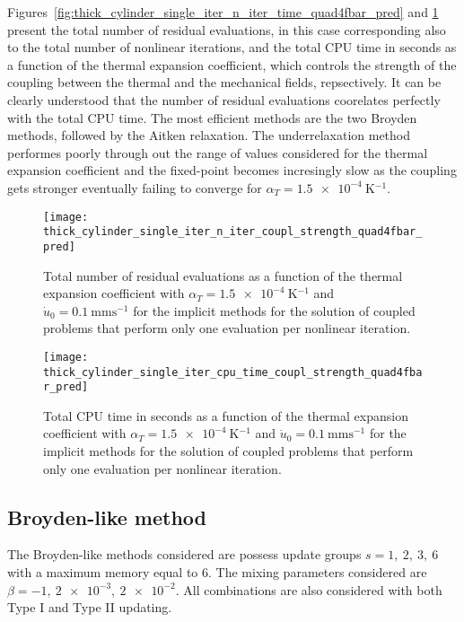 Figures~\ref{fig:thick_cylinder_single_iter_n_iter_time_quad4fbar_pred} and \ref{fig:thick_cylinder_single_iter_n_iter_coupl_strength_quad4fbar_pred} present the total number of residual evaluations, in this case corresponding also to the total number of nonlinear iterations, and the total CPU time in seconds as a function of the thermal expansion coefficient, which controls the strength of the coupling between the thermal and the mechanical fields, repsectively.
It can be clearly understood that the number of residual evaluations coorelates perfectly with the total CPU time.
The most efficient methods are the two Broyden methods, followed by the Aitken relaxation.
The underrelaxation method performes poorly through out the range of values considered for the thermal expansion coefficient and the fixed-point becomes incresingly slow as the coupling gets stronger eventually failing to converge for \(\alpha_T=\SI{1.5e-4}{\kelvin^{-1}}\).

\begin{figure}[htbp]
  \texttt{[image: thick\_cylinder\_single\_iter\_n\_iter\_coupl\_strength\_quad4fbar\_pred]}
  \caption{Total number of residual evaluations as a function of the thermal expansion coefficient with \(\alpha_T=\SI{1.5e-4}{\kelvin^{-1}}\) and \(\dot u_0 =\SI{0.1}{\milli\meter\second^{-1}}\) for the implicit methods for the solution of coupled problems that perform only one evaluation per nonlinear iteration.}
\label{fig:thick_cylinder_single_iter_n_iter_coupl_strength_quad4fbar_pred}
\end{figure}

\begin{figure}[htbp]
  \texttt{[image: thick\_cylinder\_single\_iter\_cpu\_time\_coupl\_strength\_quad4fbar\_pred]}
  \caption{Total CPU time in seconds as a function of the thermal expansion coefficient with \(\alpha_T=\SI{1.5e-4}{\kelvin^{-1}}\) and \(\dot u_0 =\SI{0.1}{\milli\meter\second^{-1}}\) for the implicit methods for the solution of coupled problems that perform only one evaluation per nonlinear iteration.}
\label{fig:thick_cylinder_single_iter_cpu_time_coupl_strength_quad4fbar_pred}
\end{figure}


\subsection{Broyden-like method}

The Broyden-like methods considered are possess update groups \(s=1,\ 2,\ 3,\ 6\) with a maximum memory equal to 6.
The mixing parameters considered are \(\beta=-1,\ \num{2e-3},\ \num{2e-2}\).
All combinations are also considered with both Type I and Type II updating.

